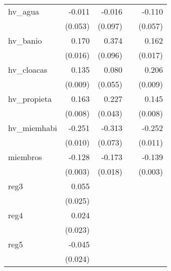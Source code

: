 {\begin{longtable}{l*{4}{D{.}{.}{-1}}}
\addlinespace
hv\_agua     &      -0.011         &      -0.016         &                     &      -0.110         \\
            &     (0.053)         &     (0.097)         &                     &     (0.057)         \\
\addlinespace
hv\_banio    &       0.170\sym{***}&       0.374\sym{***}&                     &       0.162\sym{***}\\
            &     (0.016)         &     (0.096)         &                     &     (0.017)         \\
\addlinespace
hv\_cloacas  &       0.135\sym{***}&       0.080         &                     &       0.206\sym{***}\\
            &     (0.009)         &     (0.055)         &                     &     (0.009)         \\
\addlinespace
hv\_propieta &       0.163\sym{***}&       0.227\sym{***}&                     &       0.145\sym{***}\\
            &     (0.008)         &     (0.043)         &                     &     (0.008)         \\
\addlinespace
hv\_miemhabi &      -0.251\sym{***}&      -0.313\sym{***}&                     &      -0.252\sym{***}\\
            &     (0.010)         &     (0.073)         &                     &     (0.011)         \\
\addlinespace
miembros    &      -0.128\sym{***}&      -0.173\sym{***}&                     &      -0.139\sym{***}\\
            &     (0.003)         &     (0.018)         &                     &     (0.003)         \\
\addlinespace
reg3        &       0.055\sym{*}  &                     &                     &                     \\
            &     (0.025)         &                     &                     &                     \\
\addlinespace
reg4        &       0.024         &                     &                     &                     \\
            &     (0.023)         &                     &                     &                     \\
\addlinespace
reg5        &      -0.045         &                     &                     &                     \\
            &     (0.024)         &                     &                     &                     \\

\end{longtable}}
